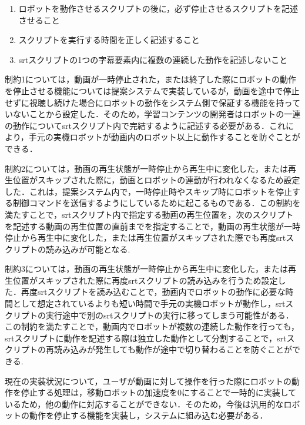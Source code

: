 \documentclass{ujarticle}
\begin{document}
\begin{enumerate}
  \item ロボットを動作させるスクリプトの後に，必ず停止させるスクリプトを記述させること
  \item スクリプトを実行する時間を正しく記述すること
  \item srtスクリプトの1つの字幕要素内に複数の連続した動作を記述しないこと
\end{enumerate}

\par 制約1については，動画が一時停止された，または終了した際にロボットの動作を停止させる機能については提案システムで実装しているが，動画を途中で停止せずに視聴し続けた場合にロボットの動作をシステム側で保証する機能を持っていないことから設定した．そのため，学習コンテンツの開発者はロボットの一連の動作についてsrtスクリプト内で完結するように記述する必要がある．これにより，手元の実機ロボットが動画内のロボット以上に動作することを防ぐことができる．
\par 制約2については，動画の再生状態が一時停止から再生中に変化した，または再生位置がスキップされた際に，動画とロボットの連動が行われなくなるため設定した．これは，提案システム内で，一時停止時やスキップ時にロボットを停止する制御コマンドを送信するようにしているために起こるものである．この制約を満たすことで，srtスクリプト内で指定する動画の再生位置を，次のスクリプトを記述する動画の再生位置の直前までを指定することで，動画の再生状態が一時停止から再生中に変化した，または再生位置がスキップされた際でも再度srtスクリプトの読み込みが可能となる.
\par 制約3については，動画の再生状態が一時停止から再生中に変化した，または再生位置がスキップされた際に再度srtスクリプトの読み込みを行うため設定した．再度srtスクリプトを読み込むことで，動画内でロボットの動作に必要な時間として想定されているよりも短い時間で手元の実機ロボットが動作し，srtスクリプトの実行途中で別のsrtスクリプトの実行に移ってしまう可能性がある．この制約を満たすことで，動画内でロボットが複数の連続した動作を行っても，srtスクリプトに動作を記述する際は独立した動作として分割することで，srtスクリプトの再読み込みが発生しても動作が途中で切り替わることを防ぐことができる.
\par 現在の実装状況について，ユーザが動画に対して操作を行った際にロボットの動作を停止する処理は，移動ロボットの加速度を0にすることで一時的に実装しているため，他の動作に対応することができない．そのため，今後は汎用的なロボットの動作を停止する機能を実装し，システムに組み込む必要がある．
\end{document}

